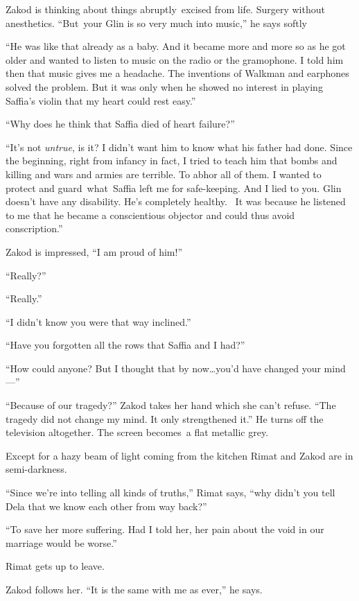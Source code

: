 \documentclass[twoside,11pt,openany]{book}
\begin{document}
Zakod is thinking about things abruptly~excised from life. Surgery without anesthetics. ``But~your Glin is
so very much into music,'' he says softly

``He was like that already as a baby. And it became more and more so as he got older and wanted to listen
to music on the radio or the gramophone. I told him then that music gives me a headache. The inventions of Walkman and
earphones solved the problem. But it was only when he showed no interest in playing Saffia's violin that my heart
could rest easy.''

``Why does he think that Saffia died of heart failure?''

``It's not\textit{ untrue}, is it? I didn't want him to know what his father had done. Since the beginning,
right from infancy in fact, I tried to teach him that bombs and killing and wars and armies are terrible. To abhor all
of them. I wanted to protect and guard~what~Saffia left me for safe-keeping. And I lied to you. Glin doesn't have any
disability. He's completely healthy. ~It was because he listened to me that he became a conscientious objector and
could thus avoid conscription.''

Zakod is impressed, ``I am proud of him!''

``Really?''

``Really.''

``I didn't know you were that way inclined.''

``Have you forgotten all the rows that Saffia and I had?''

``How could anyone?  But I thought that by now{\ldots}you'd have changed your mind ---''

``Because of our tragedy?'' Zakod takes her hand which she can't refuse. ``The
tragedy did not change my mind. It only strengthened it.'' He turns off the television altogether. The
screen becomes~a flat metallic grey.

Except for a hazy beam of light coming{ }from the kitchen Rimat and
Zakod are in semi-darkness.

``Since we're into telling all kinds of truths,'' Rimat says, ``why didn't you
tell Dela that we know each other from way back?''

``To save her more suffering. Had I told her, her pain about the void in our marriage would be
worse.''

Rimat gets up to leave.

Zakod follows her. ``It is the same with me as ever,'' he says.
\end{document}
